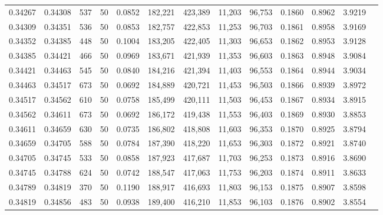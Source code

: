 \begin{tabular}{rrrrrrrrrrrrr}
0.34267 & 0.34308 &   537 &  50 &                                     0.0852 & 182,221 & 423,389 &  11,203 &  96,753 & 0.1860 & 0.8962 & 3.9219 \\
0.34309 & 0.34351 &   536 &  50 &                                     0.0853 & 182,757 & 422,853 &  11,253 &  96,703 & 0.1861 & 0.8958 & 3.9169 \\
0.34352 & 0.34385 &   448 &  50 &                                     0.1004 & 183,205 & 422,405 &  11,303 &  96,653 & 0.1862 & 0.8953 & 3.9128 \\
0.34385 & 0.34421 &   466 &  50 &                                     0.0969 & 183,671 & 421,939 &  11,353 &  96,603 & 0.1863 & 0.8948 & 3.9084 \\
0.34421 & 0.34463 &   545 &  50 &                                     0.0840 & 184,216 & 421,394 &  11,403 &  96,553 & 0.1864 & 0.8944 & 3.9034 \\
0.34463 & 0.34517 &   673 &  50 &                                     0.0692 & 184,889 & 420,721 &  11,453 &  96,503 & 0.1866 & 0.8939 & 3.8972 \\
0.34517 & 0.34562 &   610 &  50 &                                     0.0758 & 185,499 & 420,111 &  11,503 &  96,453 & 0.1867 & 0.8934 & 3.8915 \\
0.34562 & 0.34611 &   673 &  50 &                                     0.0692 & 186,172 & 419,438 &  11,553 &  96,403 & 0.1869 & 0.8930 & 3.8853 \\
0.34611 & 0.34659 &   630 &  50 &                                     0.0735 & 186,802 & 418,808 &  11,603 &  96,353 & 0.1870 & 0.8925 & 3.8794 \\
0.34659 & 0.34705 &   588 &  50 &                                     0.0784 & 187,390 & 418,220 &  11,653 &  96,303 & 0.1872 & 0.8921 & 3.8740 \\
0.34705 & 0.34745 &   533 &  50 &                                     0.0858 & 187,923 & 417,687 &  11,703 &  96,253 & 0.1873 & 0.8916 & 3.8690 \\
0.34745 & 0.34788 &   624 &  50 &                                     0.0742 & 188,547 & 417,063 &  11,753 &  96,203 & 0.1874 & 0.8911 & 3.8633 \\
0.34789 & 0.34819 &   370 &  50 &                                     0.1190 & 188,917 & 416,693 &  11,803 &  96,153 & 0.1875 & 0.8907 & 3.8598 \\
0.34819 & 0.34856 &   483 &  50 &                                     0.0938 & 189,400 & 416,210 &  11,853 &  96,103 & 0.1876 & 0.8902 & 3.8554 \\

\end{tabular}

